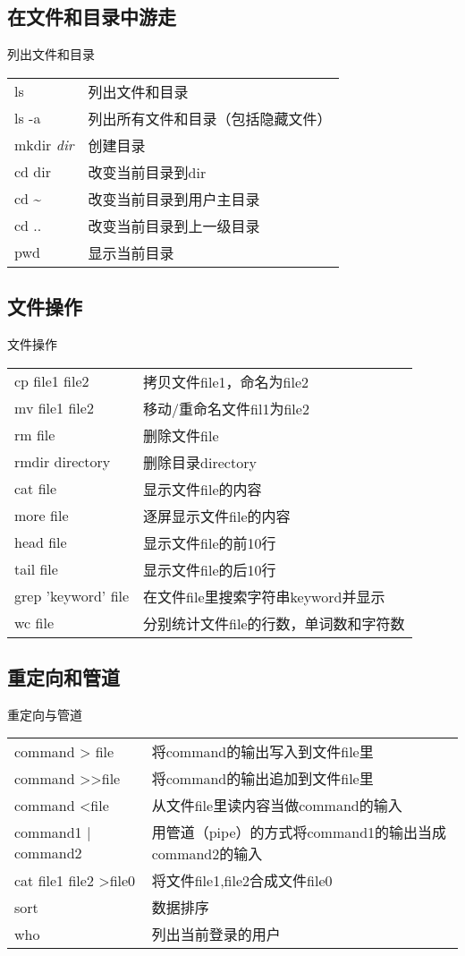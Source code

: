 \subsection{在文件和目录中游走}


\begin{frame}{列出文件和目录}

\begin{tabular}{ll}
\hline 
ls & 列出文件和目录\tabularnewline
ls -a & 列出所有文件和目录（包括隐藏文件）\tabularnewline
mkdir \emph{dir} & 创建目录\tabularnewline
cd dir & 改变当前目录到dir\tabularnewline
cd \textasciitilde{} & 改变当前目录到用户主目录\tabularnewline
cd .. & 改变当前目录到上一级目录\tabularnewline
pwd & 显示当前目录\tabularnewline
\hline 
\end{tabular}


\end{frame}

\subsection{文件操作}


\begin{frame}{文件操作}

\begin{tabular}{ll}
\hline 
cp file1 file2 & 拷贝文件file1，命名为file2\tabularnewline
mv file1 file2 & 移动/重命名文件fil1为file2\tabularnewline
rm file  & 删除文件file\tabularnewline
rmdir directory & 删除目录directory\tabularnewline
cat file & 显示文件file的内容\tabularnewline
more file & 逐屏显示文件file的内容\tabularnewline
head file & 显示文件file的前10行\tabularnewline
tail file & 显示文件file的后10行\tabularnewline
grep 'keyword' file & 在文件file里搜索字符串keyword并显示\tabularnewline
wc file & 分别统计文件file的行数，单词数和字符数\tabularnewline
\hline 
\end{tabular} 


\end{frame}

\subsection{重定向和管道}


\begin{frame}{重定向与管道}

\begin{tabular}{ll}
\hline 
command > file & 将command的输出写入到文件file里\tabularnewline
command >\textcompwordmark{}>file & 将command的输出追加到文件file里\tabularnewline
command <file & 从文件file里读内容当做command的输入\tabularnewline
command1 | command2 & 用管道（pipe）的方式将command1的输出当成command2的输入\tabularnewline
cat file1 file2 >file0 & 将文件file1,file2合成文件file0\tabularnewline
sort & 数据排序\tabularnewline
who & 列出当前登录的用户\tabularnewline
\hline 
\end{tabular}


\end{frame}

